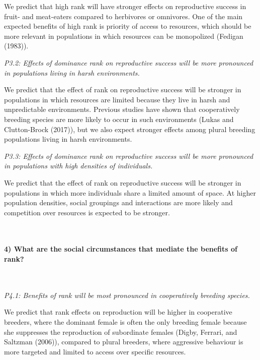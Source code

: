 \documentclass[
]{article}
\begin{document}
We predict that high rank will have stronger effects on reproductive
success in fruit- and meat-eaters compared to herbivores or omnivores.
One of the main expected benefits of high rank is priority of access to
resources, which should be more relevant in populations in which
resources can be monopolized (Fedigan (1983)).

\emph{P3.2: Effects of dominance rank on reproductive success will be
more pronounced in populations living in harsh environments.}

We predict that the effect of rank on reproductive success will be
stronger in populations in which resources are limited because they live
in harsh and unpredictable environments. Previous studies have shown
that cooperatively breeding species are more likely to occur in such
environments (Lukas and Clutton-Brock (2017)), but we also expect
stronger effects among plural breeding populations living in harsh
environments.

\emph{P3.3: Effects of dominance rank on reproductive success will be
more pronounced in populations with high densities of individuals.}

We predict that the effect of rank on reproductive success will be
stronger in populations in which more individuals share a limited amount
of space. At higher population densities, social groupings and
interactions are more likely and competition over resources is expected
to be stronger.

~

\hypertarget{what-are-the-social-circumstances-that-mediate-the-benefits-of-rank-1}{%
\paragraph{\texorpdfstring{\textbf{4) What are the social circumstances
that mediate the benefits of
rank?}}{4) What are the social circumstances that mediate the benefits of rank?}}\label{what-are-the-social-circumstances-that-mediate-the-benefits-of-rank-1}}

~

\emph{P4.1: Benefits of rank will be most pronounced in cooperatively
breeding species.}

We predict that rank effects on reproduction will be higher in
cooperative breeders, where the dominant female is often the only
breeding female because she suppresses the reproduction of subordinate
females (Digby, Ferrari, and Saltzman (2006)), compared to plural
breeders, where aggressive behaviour is more targeted and limited to
access over specific resources.
\end{document}
